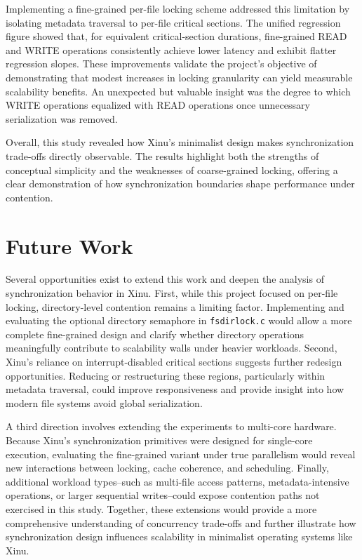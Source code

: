 \documentclass[sigconf]{acmart}
\begin{document}
Implementing a fine-grained per-file locking scheme addressed this limitation by isolating metadata traversal to per-file critical sections. The unified regression figure showed that, for equivalent critical-section durations, fine-grained READ and WRITE operations consistently achieve lower latency and exhibit flatter regression slopes. These improvements validate the project’s objective of demonstrating that modest increases in locking granularity can yield measurable scalability benefits. An unexpected but valuable insight was the degree to which WRITE operations equalized with READ operations once unnecessary serialization was removed.

Overall, this study revealed how Xinu’s minimalist design makes synchronization trade-offs directly observable. The results highlight both the strengths of conceptual simplicity and the weaknesses of coarse-grained locking, offering a clear demonstration of how synchronization boundaries shape performance under contention.






\section{Future Work}

Several opportunities exist to extend this work and deepen the analysis of synchronization behavior in Xinu. First, while this project focused on per-file locking, directory-level contention remains a limiting factor. Implementing and evaluating the optional directory semaphore in \texttt{fsdirlock.c} would allow a more complete fine-grained design and clarify whether directory operations meaningfully contribute to scalability walls under heavier workloads. Second, Xinu’s reliance on interrupt-disabled critical sections suggests further redesign opportunities. Reducing or restructuring these regions, particularly within metadata traversal, could improve responsiveness and provide insight into how modern file systems avoid global serialization.

A third direction involves extending the experiments to multi-core hardware. Because Xinu’s synchronization primitives were designed for single-core execution, evaluating the fine-grained variant under true parallelism would reveal new interactions between locking, cache coherence, and scheduling. Finally, additional workload types--such as multi-file access patterns, metadata-intensive operations, or larger sequential writes--could expose contention paths not exercised in this study. Together, these extensions would provide a more comprehensive understanding of concurrency trade-offs and further illustrate how synchronization design influences scalability in minimalist operating systems like Xinu.










\end{document}
